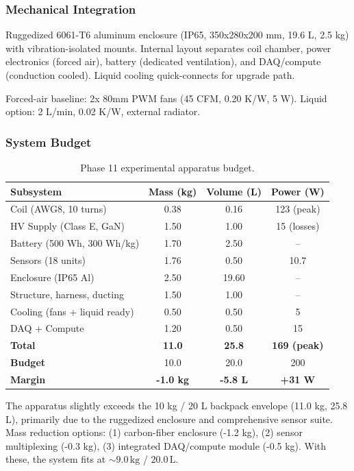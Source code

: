 \subsubsection{Mechanical Integration}

Ruggedized 6061-T6 aluminum enclosure (IP65, 350x280x200 mm, 19.6 L, 2.5 kg) with vibration-isolated mounts. Internal layout separates coil chamber, power electronics (forced air), battery (dedicated ventilation), and DAQ/compute (conduction cooled). Liquid cooling quick-connects for upgrade path.

Forced-air baseline: 2x 80mm PWM fans (45 CFM, 0.20 K/W, 5 W). Liquid option: 2 L/min, 0.02 K/W, external radiator.

\subsubsection{System Budget}

\begin{table}[t]
\centering
\caption{Phase 11 experimental apparatus budget.}
\label{tab:phase11-budget}
\begin{tabular}{lccc}
\hline
Subsystem & Mass (kg) & Volume (L) & Power (W) \\
\hline
Coil (AWG8, 10 turns) & 0.38 & 0.16 & 123 (peak) \\
HV Supply (Class E, GaN) & 1.50 & 1.00 & 15 (losses) \\
Battery (500 Wh, 300 Wh/kg) & 1.70 & 2.50 & -- \\
Sensors (18 units) & 1.76 & 0.50 & 10.7 \\
Enclosure (IP65 Al) & 2.50 & 19.60 & -- \\
Structure, harness, ducting & 1.50 & 1.00 & -- \\
Cooling (fans + liquid ready) & 0.50 & 0.50 & 5 \\
DAQ + Compute & 1.20 & 0.50 & 15 \\
\hline
\textbf{Total} & \textbf{11.0} & \textbf{25.8} & \textbf{169 (peak)} \\
\textbf{Budget} & 10.0 & 20.0 & 200 \\
\textbf{Margin} & \textbf{-1.0 kg} & \textbf{-5.8 L} & \textbf{+31 W} \\
\hline
\end{tabular}
\end{table}

The apparatus slightly exceeds the 10 kg / 20 L backpack envelope (11.0 kg, 25.8 L), primarily due to the ruggedized enclosure and comprehensive sensor suite. Mass reduction options: (1) carbon-fiber enclosure (-1.2 kg), (2) sensor multiplexing (-0.3 kg), (3) integrated DAQ/compute module (-0.5 kg). With these, the system fits at $\sim 9.0\,\text{kg}$ / $20.0\,\text{L}$.

